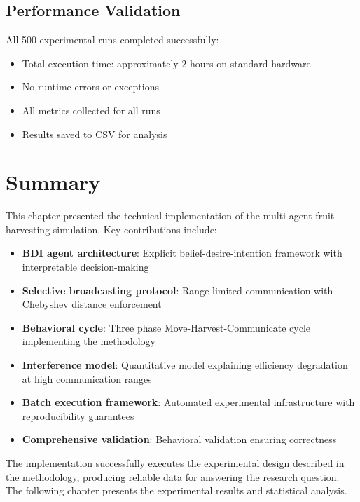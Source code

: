 \subsection{Performance Validation}

All 500 experimental runs completed successfully:
\begin{itemize}
    \item Total execution time: approximately 2 hours on standard hardware
    \item No runtime errors or exceptions
    \item All metrics collected for all runs
    \item Results saved to CSV for analysis
\end{itemize}

\section{Summary}

This chapter presented the technical implementation of the multi-agent fruit harvesting simulation. Key contributions include:

\begin{itemize}
    \item \textbf{BDI agent architecture}: Explicit belief-desire-intention framework with interpretable decision-making

    \item \textbf{Selective broadcasting protocol}: Range-limited communication with Chebyshev distance enforcement

    \item \textbf{Behavioral cycle}: Three phase Move-Harvest-Communicate cycle implementing the methodology

    \item \textbf{Interference model}: Quantitative model explaining efficiency degradation at high communication ranges

    \item \textbf{Batch execution framework}: Automated experimental infrastructure with reproducibility guarantees

    \item \textbf{Comprehensive validation}: Behavioral validation ensuring correctness
\end{itemize}

The implementation successfully executes the experimental design described in the methodology, producing reliable data for answering the research question. The following chapter presents the experimental results and statistical analysis.

